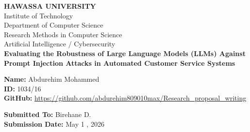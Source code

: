 \documentclass[12pt,a4paper]{article}
\begin{document}
\begin{titlepage}
    \centering
    \vspace*{1cm}
    
    {\LARGE \textbf{HAWASSA UNIVERSITY}}\\[0.5cm]
    {\LARGE Institute of Technology}\\[0.5cm]
    {\LARGE Department of Computer Science}\\[1cm]
    {\Large Research Methods in Computer Science}\\[2cm]
    {\large Artificial Intelligence / Cybersecurity}\\[0.5cm]
    
    
    \vspace{0.5cm}
    {\LARGE \textbf{Evaluating the Robustness of Large Language Models (LLMs) Against Prompt Injection Attacks in Automated Customer Service Systems}}
    \vspace{0.5cm}
    \vspace{1cm}
    
    \begin{table}[h]
        \centering
        \large
        \renewcommand{\arraystretch}{1.5}
        \vspace{1cm} %

{\Large %
\begin{flushleft}
    \textbf{Name:} Abdurehim Mohammed \\
    \textbf{ID:} 1034/16 \\
    \vspace{1cm}
    \textbf{GitHub:} \url{https://github.com/abdurehim809010max/Research_proposal_writing}
\end{flushleft}
}

\vspace{0.5cm} %

\begin{flushright}
    \textbf{Submitted To:} Birehane D. \\
    \textbf{Submission Date:} May 1 , 2026
\end{flushright}
    \end{table}
    
    \vfill
\end{titlepage}

\newpage

\tableofcontents
\newpage

\end{document}
